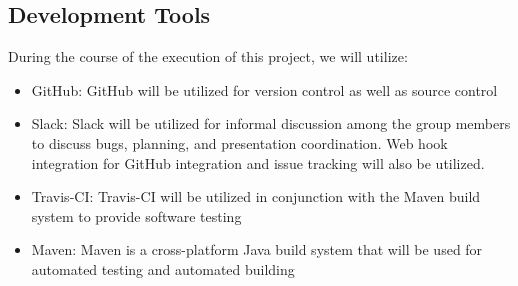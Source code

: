\documentclass[]{article}
\begin{document}
\subsection{Development Tools}
During the course of the execution of this project, we will utilize:
\begin{itemize}
	\item GitHub: GitHub will be utilized for version control as well as source control 
	\item Slack: Slack will be utilized for informal discussion among the group members to discuss bugs, planning, and presentation coordination. Web hook integration for GitHub integration and issue tracking will also be utilized.
	\item Travis-CI: Travis-CI will be utilized in conjunction with the Maven build system to provide software testing
	\item Maven: Maven is a cross-platform Java build system that will be used for automated testing and automated building
\end{itemize}
\end{document}
